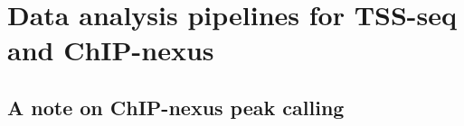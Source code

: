 \section{Data analysis pipelines for TSS-seq and ChIP-nexus}


\subsection{A note on ChIP-nexus peak calling}



